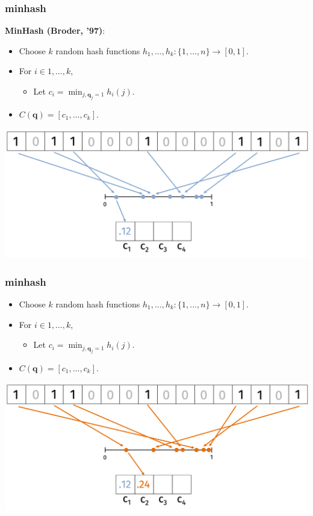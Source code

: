\documentclass[compress]{beamer}
\newcommand{\bv}[1]{\mathbf{#1}}
\begin{document}
\begin{frame}
	\frametitle{minhash}
	\textbf{MinHash (Broder, '97)}:
	\begin{itemize}
	\item Choose $k$ random hash functions $h_1, \ldots, h_k: \{1,\ldots, n\} \rightarrow [0,1]$. 
	\item For $i\in 1, \ldots,k$, 
	\begin{itemize}
		\item Let $c_i = \min_{j, \bv{q}_j = 1} h_i(j)$.
	\end{itemize}
	\item $C(\bv{q}) = [c_1, \ldots, c_k]$.
	\end{itemize}
	\begin{center}
			\includegraphics[width=\textwidth]{minHash1.png}	
	\end{center}
\end{frame}

\begin{frame}
	\frametitle{minhash}
	\begin{itemize}
		\item Choose $k$ random hash functions $h_1, \ldots, h_k: \{1,\ldots, n\} \rightarrow [0,1]$. 
		\item For $i\in 1, \ldots,k$, 
		\begin{itemize}
			\item Let $c_i = \min_{j, \bv{q}_j = 1} h_i(j)$.
		\end{itemize}
		\item $C(\bv{q}) = [c_1, \ldots, c_k]$.
	\end{itemize}
	\begin{center}
		\includegraphics[width=\textwidth]{minHash2.png}	
	\end{center}
\end{frame}
\end{document}
